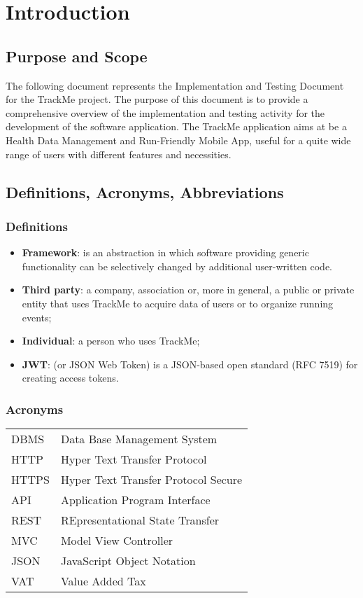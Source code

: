 \section{Introduction}
\subsection{Purpose and Scope}
	The following document represents the Implementation and Testing Document for
the TrackMe project.
The purpose of this document is to provide a comprehensive overview of the
implementation and testing activity for the development of the software application.
The TrackMe application aims at be a Health Data Management and Run-Friendly Mobile
App, useful for a quite wide range of users with different features and necessities.
\subsection{Definitions, Acronyms, Abbreviations}

\subsubsection{Definitions}
\begin{itemize}
	\item \textbf{Framework}: is an abstraction in which software providing generic functionality can be selectively changed by additional user-written code.
		
	\item \textbf{Third party}: a company, association or, more in general, a public or private entity that uses TrackMe to acquire data of users or to organize running events;

	\item \textbf{Individual}: a person who uses TrackMe;
	
	\item \textbf{JWT}: (or JSON Web Token) is a JSON-based open standard (RFC 7519) for creating access tokens.

\end{itemize}

\subsubsection{Acronyms}

\begin{center}
	\begin{tabular}{| l | l |}
		\hline
		DBMS & Data Base Management System\\
		HTTP & Hyper Text Transfer Protocol\\
		HTTPS & Hyper Text Transfer Protocol Secure\\
		API & Application Program Interface \\
		REST & REpresentational State Transfer\\
		MVC & Model View Controller\\
		JSON & JavaScript Object Notation \\
		VAT & Value Added Tax\\
		\hline
	\end{tabular}
\end{center}

